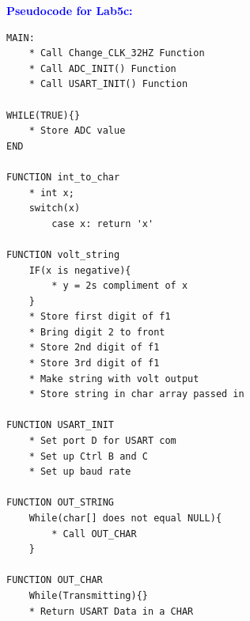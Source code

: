 \documentclass[11pt]{article}
\theoremstyle{plain}
\theoremstyle{definition}
\begin{document}
%
%
\newpage
\textbf{\textcolor{blue}{Pseudocode for Lab5c:}}
\begin{tcolorbox}
\begin{verbatim}
MAIN:
    * Call Change_CLK_32HZ Function
    * Call ADC_INIT() Function
    * Call USART_INIT() Function

WHILE(TRUE){}
    * Store ADC value
END

FUNCTION int_to_char
    * int x;
    switch(x)
        case x: return 'x'
        
FUNCTION volt_string
    IF(x is negative){
        * y = 2s compliment of x
    }
    * Store first digit of f1
    * Bring digit 2 to front
    * Store 2nd digit of f1
    * Store 3rd digit of f1
    * Make string with volt output
    * Store string in char array passed in
	
FUNCTION USART_INIT
    * Set port D for USART com
    * Set up Ctrl B and C
    * Set up baud rate
    
FUNCTION OUT_STRING
    While(char[] does not equal NULL){
        * Call OUT_CHAR
    }

FUNCTION OUT_CHAR
    While(Transmitting){}
    * Return USART Data in a CHAR
\end{verbatim}
\end{tcolorbox}
\end{document}

